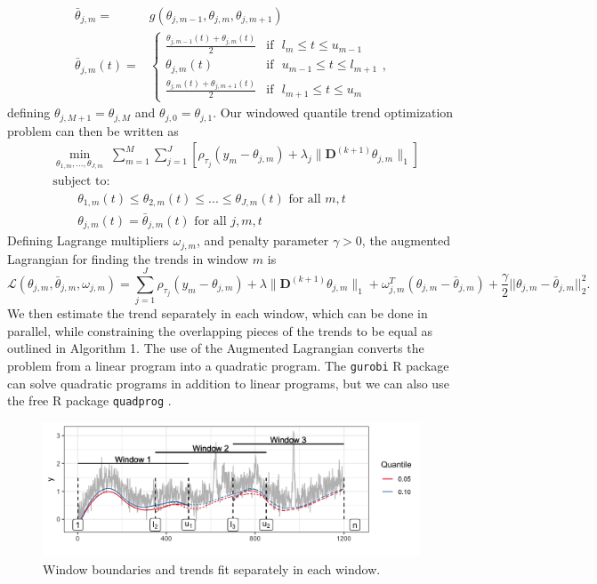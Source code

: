 \documentclass[12pt]{article}
\begin{document}
	 \begin{align*}
	\bar{\theta}_{j, m}	=&  g(\theta_{j, m-1}, \theta_{j,m}, \theta_{j,m+1}) \\
	\bar{\theta}_{j, m}(t)	 =& \begin{cases} 
			 \frac{\theta_{j,m-1}(t)+\theta_{j,m}(t)}{2} & \mbox{if~~} l_{m} \le t \le u_{m-1}  \\
			 \theta_{j,m}(t) & \mbox{if~~} u_{m-1} \le t \le l_{m+1}  \\
			 \frac{\theta_{j,m}(t)+\theta_{j,m+1}(t)}{2} & \mbox{if~~} l_{m+1} \le t \le u_{m}  
			 \end{cases},
	\end{align*}
	defining $\theta_{j,M+1} = \theta_{j,M}$ and $\theta_{j,0} = \theta_{j,1}$. Our windowed quantile trend optimization problem can then be written as 
	 \begin{align*}
		 \label{eq:quantile_windows}
		 &\underset{\theta_{1,m}, ..., \theta_{J,m}}{\min}\; \sum_{m=1}^M\sum_{j=1}^J \left [\rho_{\tau_j}(y_m - \theta_{j,m}) + 
		 \lambda_j \lVert \mathbf{D}^{(k+1)} \theta_{j,m} \rVert_1 \right ] \\
		 &\text{subject to: }\; \\
		 &\qquad \theta_{1,m}(t) \le \theta_{2,m}(t) \le ... \le \theta_{J,m}(t) \text{ for all } m,t \\
		 &\qquad \theta_{j,m}(t) = \bar{\theta}_{j,m}(t) \text{ for all } j, m, t
	 \end{align*}
	 Defining Lagrange multipliers $\omega_{j,m}$, and penalty parameter $\gamma > 0$, the augmented Lagrangian for finding the trends in window $m$ is
	 \begin{equation*}
	 \mathcal{L}(\theta_{j,m}, \bar{\theta}_{j,m}, \omega_{j,m}) = \sum_{j=1}^J\rho_{\tau_j}(y_m - \theta_{j,m})+\lambda \lVert \mathbf{D}^{(k+1)}\theta_{j,m}\rVert_1 +  \omega_{j,m}^T(\theta_{j,m} - \bar{\theta}_{j,m}) + 
	 \frac{\gamma}{2}||\theta_{j,m} - \bar{\theta}_{j,m}||_2^2.
	 \end{equation*}
	 We then estimate the trend separately in each window, which can be done in parallel, while constraining the overlapping pieces of the trends to be equal as outlined in Algorithm 1. The use of the Augmented Lagrangian converts the problem from a linear program into a quadratic program. The \texttt{gurobi} R package \citep{gurobi} can solve quadratic programs in addition to linear programs, but we can also use the free R package \texttt{quadprog} \citep{quadprog}. 
	 
	\begin{figure}[!h] 
		\centering
		\includegraphics[width = 0.8\linewidth]{Figures/overlapping_windows.png}
		\caption{Window boundaries and trends fit separately in each window.}
		\label{fig:windows}
	\end{figure}
\end{document}

